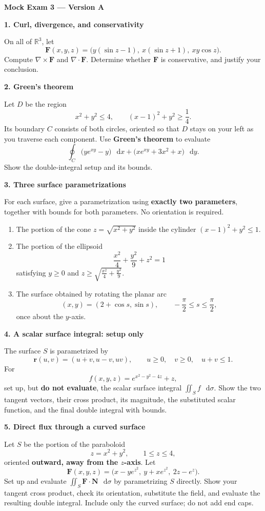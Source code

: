 \documentclass[11pt,letterpaper]{article}
\newcommand{\curl}{\nabla\times}
\newcommand{\dv}{\nabla\cdot}
\renewcommand{\vec}[1]{\mathbf{#1}}
\newcommand{\dd}{\mathop{}\!\mathrm{d}}
\newcommand{\examproblem}[3]{%
  \par\medskip\Needspace{5\baselineskip}
  \noindent\textbf{#1. #2}\par\nobreak
}
\begin{document}
{\large\bfseries Mock Exam 3 --- Version A}
\smallskip
\examproblem{1}{Curl, divergence, and conservativity}{10}
On all of $\mathbb R^3$, let
\[
\vec F(x,y,z)=\bigl(y(\sin z-1),\ x(\sin z+1),\ xy\cos z\bigr).
\]
Compute $\curl\vec F$ and $\dv\vec F$. Determine whether $\vec F$ is
conservative, and justify your conclusion.

\examproblem{2}{Green's theorem}{12}
Let $D$ be the region
\[
x^2+y^2\le4,\qquad (x-1)^2+y^2\ge\frac14.
\]
Its boundary $C$ consists of both circles, oriented so that $D$ stays on
your left as you traverse each component. Use \textbf{Green's theorem}
to evaluate
\[
\oint_C\bigl(ye^{xy}-y\bigr)\,\dd x
+\bigl(xe^{xy}+3x^2+x\bigr)\,\dd y.
\]
Show the double-integral setup and its bounds.

\examproblem{3}{Three surface parametrizations}{12}
For each surface, give a parametrization using \textbf{exactly two
parameters}, together with bounds for both parameters. No orientation is required.

\begin{enumerate}[label=(\alph*)]
\item The portion of the cone $z=\sqrt{x^2+y^2}$ inside the cylinder
$(x-1)^2+y^2\le1$.

\item The portion of the ellipsoid
\[
\frac{x^2}{4}+\frac{y^2}{9}+z^2=1
\]
satisfying $y\ge0$ and
$\displaystyle z\ge\sqrt{\frac{x^2}{4}+\frac{y^2}{9}}$.

\item The surface obtained by rotating the planar arc
\[
(x,y)=(2+\cos s,\sin s),\qquad-\frac\pi2\le s\le\frac\pi2,
\]
once about the $y$-axis.

\end{enumerate}

\examproblem{4}{A scalar surface integral: setup only}{12}
The surface $S$ is parametrized by
\[
\vec r(u,v)=(u+v,u-v,uv),\qquad
u\ge0,\quad v\ge0,\quad u+v\le1.
\]
For
\[
f(x,y,z)=e^{x^2-y^2-4z}+z,
\]
set up, but \textbf{do not evaluate}, the scalar surface integral
$\displaystyle\iint_S f\,\dd\sigma$.
Show the two tangent vectors, their cross product, its magnitude, the
substituted scalar function, and the final double integral with bounds.

\examproblem{5}{Direct flux through a curved surface}{20}
Let $S$ be the portion of the paraboloid
\[
z=x^2+y^2,\qquad1\le z\le4,
\]
oriented \textbf{outward, away from the $z$-axis}. Let
\[
\vec F(x,y,z)=\bigl(x-ye^{z^2},\ y+xe^{z^2},\ 2z-e^z\bigr).
\]
Set up and evaluate $\displaystyle\iint_S\vec F\cdot\vec N\,\dd\sigma$
by parametrizing $S$ directly. Show your tangent cross product, check
its orientation, substitute the field, and evaluate the resulting
double integral. Include only the curved surface; do not add end caps.
\end{document}
